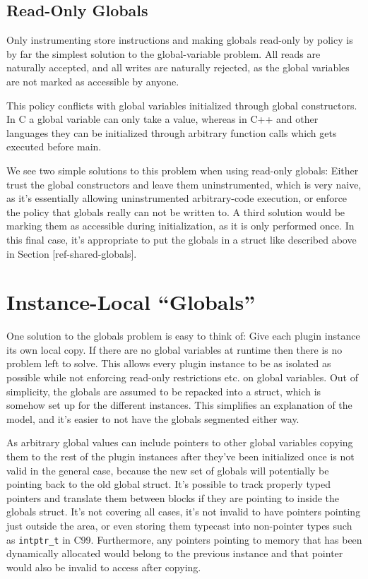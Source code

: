 \subsection {Read-Only Globals}

Only instrumenting store instructions and making globals read-only by policy is
by far the simplest solution to the global-variable problem. All reads are
naturally accepted, and all writes are naturally rejected, as the global
variables are not marked as accessible by anyone.

This policy conflicts with global variables initialized through global
constructors. In C a global variable can only take a value, whereas in C++ and
other languages they can be initialized through arbitrary function calls which
gets executed before main.

We see two simple solutions to this problem when using read-only globals: Either
trust the global constructors and leave them uninstrumented, which is very
naive, as it's essentially allowing uninstrumented arbitrary-code execution, or
enforce the policy that globals really can not be written to. A third solution
would be marking them as accessible during initialization, as it is only
performed once. In this final case, it's appropriate to put the globals in a
struct like described above in Section [ref-shared-globals].


\section {Instance-Local ``Globals''}

One solution to the globals problem is easy to think of: Give each plugin
instance its own local copy. If there are no global variables at runtime then
there is no problem left to solve. This allows every plugin instance to be as
isolated as possible while not enforcing read-only restrictions etc. on global
variables. Out of simplicity, the globals are assumed to be repacked into a
struct, which is somehow set up for the different instances. This simplifies an
explanation of the model, and it's easier to not have the globals segmented
either way.

As arbitrary global values can include pointers to other global variables
copying them to the rest of the plugin instances after they've been initialized
once is not valid in the general case, because the new set of globals will
potentially be pointing back to the old global struct. It's possible to track
properly typed pointers and translate them between blocks if they are pointing
to inside the globals struct. It's not covering all cases, it's not invalid to
have pointers pointing just outside the area, or even storing them typecast into
non-pointer types such as \texttt{intptr\_t} in C99. Furthermore, any pointers
pointing to memory that has been dynamically allocated would belong to the
previous instance and that pointer would also be invalid to access after
copying.

